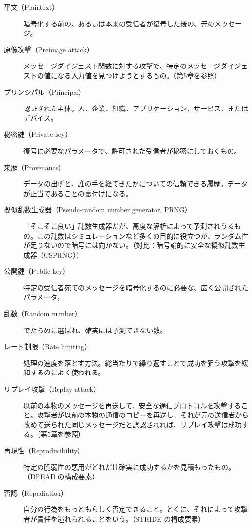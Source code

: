 \documentclass[uplatex]{jsarticle}
\begin{document}
\begin{description}
\item[平文（Plaintext）]
暗号化する前の、あるいは本来の受信者が復号した後の、元のメッセージ。

\item[原像攻撃（Preimage attack）]
メッセージダイジェスト関数に対する攻撃で、特定のメッセージダイジェストの値になる入力値を見つけようとするもの。（第5章を参照）

\item[プリンシパル（Principal）]
認証された主体。人、企業、組織、アプリケーション、サービス、またはデバイス。

\item[秘密鍵（Private key）]
復号に必要なパラメータで、許可された受信者が秘密にしておくもの。

\item[来歴（Provenance）]
データの出所と、誰の手を経てきたかについての信頼できる履歴。データが正当であることの裏付けになる。

\item[擬似乱数生成器（Pseudo-random number generator, PRNG）]
「そこそこ良い」乱数生成器だが、高度な解析によって予測されうるもの。この乱数はシミュレーションなど多くの目的に役立つが、ランダム性が足りないので暗号には向かない。（対比：暗号論的に安全な擬似乱数生成器（CSPRNG））

\item[公開鍵（Public key）]
特定の受信者宛てのメッセージを暗号化するのに必要な、広く公開されたパラメータ。

\item[乱数（Random number）]
でたらめに選ばれ、確実には予測できない数。

\item[レート制限（Rate limiting）]
処理の速度を落とす方法。総当たりで繰り返すことで成功を狙う攻撃を緩和するのによく使われる。

\item[リプレイ攻撃（Replay attack）]
以前の本物のメッセージを再送して、安全な通信プロトコルを攻撃すること。攻撃者が以前の本物の通信のコピーを再送し、それが元の送信者から改めて送られた同じメッセージだと誤認されれば、リプレイ攻撃は成功する。（第5章を参照）

\item[再現性（Reproducibility）]
特定の脆弱性の悪用がどれだけ確実に成功するかを見積もったもの。（DREAD の構成要素）

\item[否認（Repudiation）]
自分の行為をもっともらしく否定できること。とくに、それによって攻撃者が責任を逃れられることをいう。（STRIDE の構成要素）


\end{description}
\end{document}
